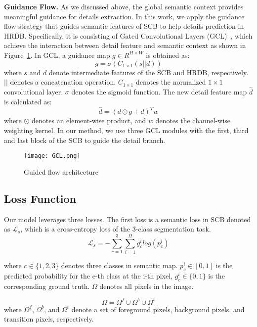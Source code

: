 \documentclass[10pt,twocolumn,letterpaper]{article}
\begin{document}
\textbf{Guidance Flow.}
As we discussed above, the global semantic context provides meaningful guidance for details extraction. In this work, we apply the guidance flow strategy that guides semantic features of SCB to help details prediction in HRDB. Specifically, it is consisting of Gated Convolutional Layers (GCL)~\cite{takikawa2019gated}, which achieve the interaction between detail feature and semantic context as shown in Figure~\ref{fig:gcl}. In GCL, a guidance map $g \in R^{H \times W}$ is obtained as:
\begin{equation}
  g = \sigma(C_{1\times1}(s||d))
  \label{eq:attention}
\end{equation}
where $s$ and $d$ denote intermediate features of the SCB and HRDB, respectively. $||$ denotes a concatenation operation. $C_{1\times1}$ denotes the normalized $1\times1$ convolutional layer. $\sigma$ denotes the sigmoid function. The new detail feature map $\hat{d}$ is calculated as:
\begin{equation}
    \hat{d} = (d \odot g + d)^Tw
    \label{eq:gcl}
\end{equation}
where $\odot$ denotes an element-wise product, and $w$ denotes the channel-wise weighting kernel. In our method, we use three GCL modules with the first, third and last block of the SCB to guide the detail branch.

\begin{figure}[t]
\centering
    \texttt{[image: GCL.png]}
    \caption{Guided flow architecture}
    \label{fig:gcl}
\end{figure}


\subsection{Loss Function}

Our model leverages three losses. The first loss is a semantic loss in SCB denoted as $\mathcal{L}_{s}$, which is a cross-entropy loss of the 3-class segmentation task.
\begin{equation} \mathcal{L}_{s} = -\sum_{c=1}^{3}\sum_{i=1}^{\Omega}g_c^ilog(p_c^i) \label{eq:lt}
\end{equation}

where $c \in \{1,2,3\}$ denotes three classes in semantic map. $p_c^i \in [0,1]$ is the predicted probability for the c-th class at the i-th pixel, $g_c^i \in \{0,1\}$ is the corresponding ground truth. $\Omega$ denotes all pixels in the image.

\begin{equation} \Omega = \Omega^f \cup \Omega^b \cup \Omega^t\label{eq:set}
\end{equation}
where $\Omega^f$, $\Omega^b$, and $\Omega^t$ denote a set of foreground pixels, background pixels, and transition pixels, respectively.
\end{document}
